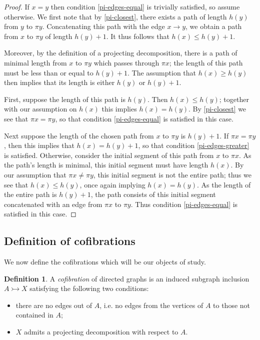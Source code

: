\documentclass[11pt]{article}
\theoremstyle{definition}
\newtheorem{defi}[theo]{Definition}
\numberwithin{equation}{section}
\newcommand{\cto}{\rightarrowtail}
\begin{document}
\begin{proof}
If $x = y$ then condition \ref{pi-edges-equal} is trivially satisfied, so assume otherwise. We first note that by \cref{pi-closest}, there exists a path of length $h(y)$ from $y$ to $\pi y$. Concatenating this path with the edge $x \to y$, we obtain a path from $x$ to $\pi y$ of length $h(y) + 1$. It thus follows that $h(x) \leq h(y) + 1$. 

Moreover, by the definition of a projecting decomposition, there is a path of minimal length from $x$ to $\pi y$ which passes through $\pi x$; the length of this path must be less than or equal to $h(y) + 1$. The assumption that $h(x) \geq h(y)$ then implies that its length is either $h(y)$ or $h(y) + 1$.

First, suppose the length of this path is $h(y)$. Then $h(x) \leq h(y)$; together with our assumption on $h(x)$ this implies $h(x) = h(y)$. By \cref{pi-closest} we see that $\pi x = \pi y$, so that condition \ref{pi-edges-equal} is satisfied in this case.

Next suppose the length of the chosen path from $x$ to $\pi y$ is $h(y) + 1$. If $\pi x = \pi y$, then this implies that $h(x) = h(y) + 1$, so that condition \ref{pi-edges-greater} is satisfied. Otherwise, consider the initial segment of this path from $x$ to $\pi x$. As the path's length is minimal, this initial segment must have length $h(x)$. By our assumption that $\pi x \neq \pi y$, this initial segment is not the entire path; thus we see that $h(x) \leq h(y)$, once again implying $h(x) = h(y)$. As the length of the entire path is $h(y) + 1$, the path consists of this initial segment concatenated with an edge from $\pi x$ to $\pi y$. Thus condition \ref{pi-edges-equal} is satisfied in this case.
\end{proof}

\subsection{Definition of cofibrations}

We now define the cofibrations which will be our objects of study.

\begin{defi}\label{cofib-def}
A \emph{cofibration} of directed graphs is an induced subgraph inclusion $A \cto X$ satisfying the following two conditions:
\begin{itemize}
    \item there are no edges out of $A$, i.e.  no edges from the vertices of $A$ to those not contained in $A$;
    \item $X$ admits a projecting decomposition with respect to $A$.
\end{itemize}
\end{defi}
\end{document}
